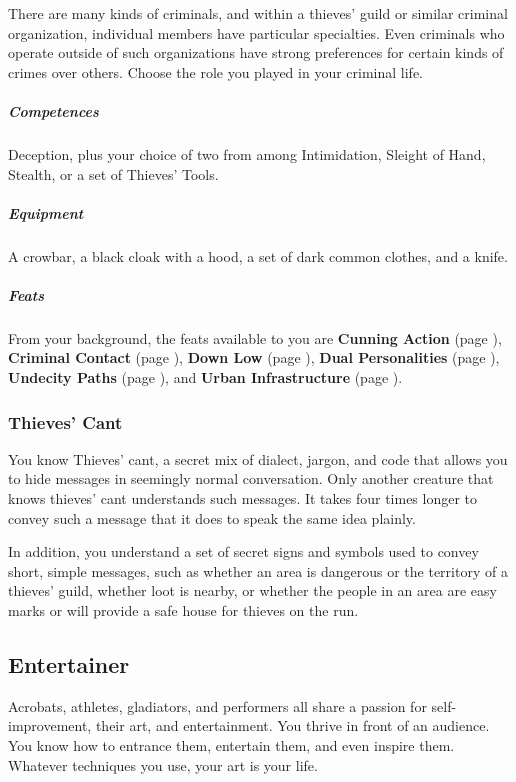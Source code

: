     There are many kinds of criminals, and within a thieves' guild or similar criminal organization, individual members have particular specialties.
    Even criminals who operate outside of such organizations have strong preferences for certain kinds of crimes over others.
    Choose the role you played in your criminal life.

    \subparagraph{Competences} Deception, plus your choice of two from among Intimidation, Sleight of Hand, Stealth, or a set of Thieves' Tools.

    \subparagraph{Equipment} A crowbar, a black cloak with a hood, a set of dark common clothes, and a knife.

    \subparagraph{Feats} From your background, the feats available to you are
    \textbf{Cunning Action} (page \pageref{feat::cunningaction}),
    \textbf{Criminal Contact} (page \pageref{feat::criminalcontact}),
    \textbf{Down Low} (page \pageref{feat::downlow}),
    \textbf{Dual Personalities} (page \pageref{feat::dualpersonalities}),
    \textbf{Undecity Paths} (page \pageref{feat::undercitypaths}), and
    \textbf{Urban Infrastructure} (page \pageref{feat::urbaninfrastructure}).

    \subsubsection{Thieves' Cant} \label{feat::thievescant}
        You know Thieves' cant, a secret mix of dialect, jargon, and code that allows you to hide messages in seemingly normal conversation.
        Only another creature that knows thieves' cant understands such messages.
        It takes four times longer to convey such a message that it does to speak the same idea plainly.

        In addition, you understand a set of secret signs and symbols used to convey short, simple messages, such as whether an area is dangerous or the territory of a thieves' guild, whether loot is nearby, or whether the people in an area are easy marks or will provide a safe house for thieves on the run.

\subsection*{Entertainer} \label{ssec::entertainer}
    Acrobats, athletes, gladiators, and performers all share a passion for self-improvement, their art, and entertainment. %
    You thrive in front of an audience.
    You know how to entrance them, entertain them, and even inspire them.
    Whatever techniques you use, your art is your life.

